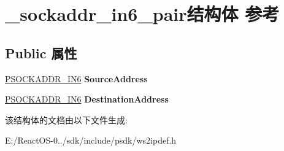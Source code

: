 \hypertarget{struct__sockaddr__in6__pair}{}\section{\+\_\+sockaddr\+\_\+in6\+\_\+pair结构体 参考}
\label{struct__sockaddr__in6__pair}
\subsection*{Public 属性}
\begin{DoxyCompactItemize}
\item 
\mbox{\label{struct__sockaddr__in6__pair_a3618fb94698bd25ba1336c1ae7787243}} 
\hyperlink{structsockaddr__in6}{P\+S\+O\+C\+K\+A\+D\+D\+R\+\_\+\+I\+N6} {\bfseries Source\+Address}
\item 
\mbox{\label{struct__sockaddr__in6__pair_a77b5e40eb8c779fb7e9fe8e29552ddd8}} 
\hyperlink{structsockaddr__in6}{P\+S\+O\+C\+K\+A\+D\+D\+R\+\_\+\+I\+N6} {\bfseries Destination\+Address}
\end{DoxyCompactItemize}


该结构体的文档由以下文件生成\+:\begin{DoxyCompactItemize}
\item 
E\+:/\+React\+O\+S-\/0../sdk/include/psdk/ws2ipdef.\+h\end{DoxyCompactItemize}
